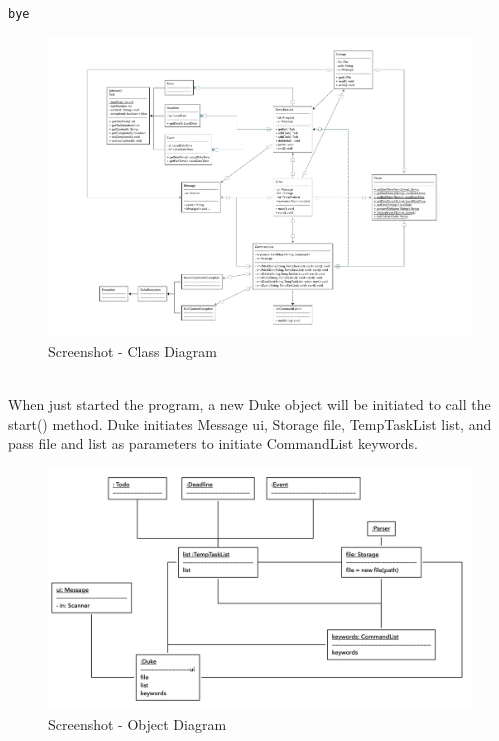 \documentclass[a4paper,11pt, twoside]{article}
\begin{document}
\begin{table} [htbp]
\begin{multicols}{2}
\begin{verbatim}
bye
\end{verbatim}
\end{multicols}

\clearpage 
\begin{landscape}
\appendixpage


\begin{figure}[h]
\centering
\includegraphics[width = 15.6cm]{class.pdf}
\caption{Screenshot - Class Diagram} 
\label{class}
\end{figure} 
\clearpage

\\When just started the program, a new Duke object will be initiated to call the start() method. 
Duke initiates Message ui, Storage file, TempTaskList list, and pass file and list as parameters to initiate CommandList keywords. 
\begin{figure}[H]
\centering
\includegraphics[width = 15.4cm]{object.png}
\caption{Screenshot - Object Diagram} 
\label{object}
\end{figure} 



\end{landscape}
\end{table}
\end{document}
